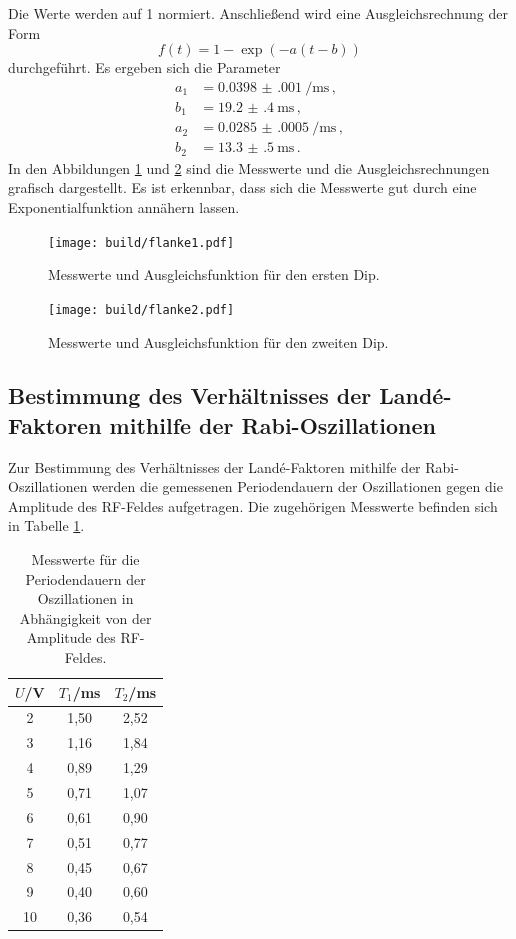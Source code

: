 \begin{equatio*}
Die Werte werden auf 1 normiert. Anschließend wird eine Ausgleichsrechnung der Form
\begin{equation*}
  f(t)=1-\exp(-a(t-b))
\end{equation*}
durchgeführt. Es ergeben sich die Parameter
\begin{align*}
  a_1&=\SI{0.0398(0010)}{\per\milli\second} \,,\\
  b_1&=\SI{19.2(4)}{\milli\second} \,,\\
  a_2&=\SI{0.0285(0005)}{\per\milli\second}\,,\\
  b_2&=\SI{13.3(5)}{\milli\second} \,.
\end{align*}
In den Abbildungen \ref{fig:flankefit1} und \ref{fig:flankefit2} sind die Messwerte und die
Ausgleichsrechnungen grafisch dargestellt. Es ist erkennbar, dass sich die Messwerte gut
durch eine Exponentialfunktion annähern lassen.

\begin{figure}
  \centering
  \texttt{[image: build/flanke1.pdf]}
  \caption{Messwerte und Ausgleichsfunktion für den ersten Dip.}
  \label{fig:flankefit1}
\end{figure}
\begin{figure}
  \centering
  \texttt{[image: build/flanke2.pdf]}
  \caption{Messwerte und Ausgleichsfunktion für den zweiten Dip.}
  \label{fig:flankefit2}
\end{figure}

\newpage
\subsection{Bestimmung des Verhältnisses der Landé-Faktoren mithilfe der Rabi-Oszillationen}
\label{subsec:oszillationen}
Zur Bestimmung des Verhältnisses der Landé-Faktoren mithilfe der Rabi-Oszillationen werden
die gemessenen Periodendauern der Oszillationen gegen die Amplitude des RF-Feldes aufgetragen.
Die zugehörigen Messwerte befinden sich in Tabelle \ref{tab:oszi}.

\begin{table}[htp]
	\begin{center}
    \caption{Messwerte für die Periodendauern der Oszillationen in Abhängigkeit von der Amplitude des RF-Feldes.}
    \label{tab:oszi}
		\begin{tabular}{ccc}
		\toprule
			{$U$/V} & {$T_1$/ms} & {$T_2$/ms}\\
			\midrule
			2 & 1,50 & 2,52\\
			3 & 1,16 & 1,84\\
			4 & 0,89 & 1,29\\
			5 & 0,71 & 1,07\\
			6 & 0,61 & 0,90\\
			7 & 0,51 & 0,77\\
			8 & 0,45 & 0,67\\
			9 & 0,40 & 0,60\\
			10& 0,36 & 0,54\\
		\bottomrule
		\end{tabular}
	\end{center}
\end{table}


\end{equatio*}
